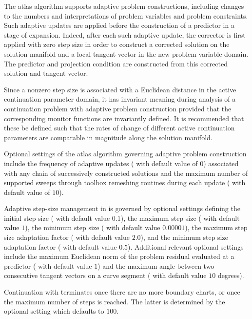 The  atlas algorithm supports adaptive problem constructions, including changes to the numbers and interpretations of problem variables and problem constraints. Such adaptive updates are applied before the construction of a predictor in a stage of expansion. Indeed, after each such adaptive update, the corrector is first applied with zero step size in order to construct a corrected solution on the solution manifold and a local tangent vector in the new problem variable domain. The predictor and projection condition are constructed from this corrected solution and tangent vector. 

Since a nonzero step size is associated with a Euclidean distance in the active continuation parameter domain, it has invariant meaning during analysis of a continuation problem with adaptive problem construction provided that the corresponding monitor functions are invariantly defined. It is recommended that these be defined such that the rates of change of different active continuation parameters are comparable in magnitude along the solution manifold.

Optional settings of the  atlas algorithm governing adaptive problem construction include the frequency of adaptive updates ( with default value of $0$) associated with any chain of successively constructed solutions and the maximum number of supported sweeps through toolbox remeshing routines during each update ( with default value of $10$).

Adaptive step-size management in  is governed by optional settings defining the initial step size ( with default value $0.1$), the maximum step size ( with default value $1$), the minimum step size ( with default value $0.00001$), the maximum step size adaptation factor ( with default value $2.0$), and the minimum step size adaptation factor ( with default value $0.5$). Additional relevant optional settings include the maximum Euclidean norm of the problem residual evaluated at a predictor ( with default value $1$) and the maximum angle between two consecutive tangent vectors on a curve segment ( with default value $10$ degrees).

Continuation with  terminates once there are no more boundary charts, or once the maximum number of steps is reached. The latter is determined by the optional setting  which defaults to $100$.

